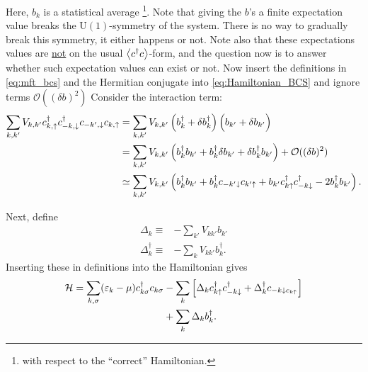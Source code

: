 Here, $b_k$ is a statistical average \footnote{with respect to the ``correct'' Hamiltonian.}. Note that giving the $b$'s a finite expectation value breaks the $\mathrm{U}(1)$-symmetry of the system. There is no way to gradually break this symmetry, it either happens or not. Note also that these expectations values are \underline{not} on the usual $\ev{c^\dagger c}$-form, and the question now is to answer whether such expectation values can exist or not.
Now insert the definitions in \cref{eq:mft_bcs} and the Hermitian conjugate into \cref{eq:Hamiltonian_BCS} and ignore terms $\mathcal{O}((\delta b)^2)$
Consider the interaction term:
\begin{align*}
\sum_{k,k'}V_{k,k'} c^{\dagger}_{k,\uparrow}c^{\dagger}_{-k, \downarrow}c_{-k',\downarrow}c_{k,\uparrow}
 &= \sum_{k,k'}V_{k,k'} \left(b_k^\dagger + \delta b_k^\dagger\right)\left(b_{k'} + \delta b_{k'}\vphantom{b_k^\dagger}\right)\\
&= \sum_{k,k'}V_{k,k'}\left(b_k^\dagger b_{k'} + b_k^\dagger\delta b_{k'} + \delta b_k^\dagger b_{k'}\right) + \mathcal{O}((\delta b)^2)\\
&\simeq \sum_{k,k'}V_{k,k'}\left(b_k^\dagger b_{k'} + b_k^\dagger c_{-k'\downarrow}c_{k'\uparrow} + b_{k'}c^{\dagger}_{k\uparrow}c^{\dagger}_{-k\downarrow} - 2b^\dagger_kb_{k'}\right).
\end{align*}

Next, define
\begin{subequations}
	\label{eq:defs_delta}
\begin{align}
	\Delta_k\equiv&-\sum_{k'}V_{kk'}b_{k'} \label{eq:def_delta1} \\
	\Delta_k^\dagger\equiv&-\sum_{k}V_{kk'}b_k^\dagger. \label{eq:def_delta2}
\end{align}
\end{subequations}
Inserting these in definitions into the Hamiltonian gives
\begin{align}
\label{eq:BCS_MFT}
	\begin{split}
	\mathcal{H} = \sum_{k,\sigma}(\varepsilon_k - \mu)c^{\dagger}_{k\sigma}c_{k\sigma} 
	&-\sum_k\left[\Delta_k c_{k\uparrow}^\dagger c_{-k\downarrow}^\dagger + \Delta_k^\dagger c_{-k\downarrow c_{k\uparrow}}\right] \\
	&+ \sum_k \Delta_k b_k^\dagger.
	\end{split}
\end{align}

